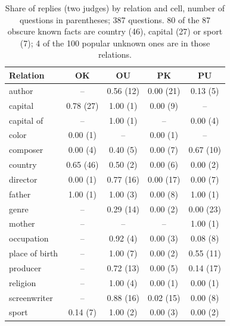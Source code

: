 \begin{table}[h]
\centering\footnotesize\setlength{\tabcolsep}{3pt}
\begin{tabular}{lcccc}
\toprule
Relation & OK & OU & PK & PU \\
\midrule
author & -- & 0.56 (12) & 0.00 (21) & 0.13 (5) \\
capital & 0.78 (27) & 1.00 (1) & 0.00 (9) & -- \\
capital of & -- & 1.00 (1) & -- & 0.00 (4) \\
color & 0.00 (1) & -- & 0.00 (1) & -- \\
composer & 0.00 (4) & 0.40 (5) & 0.00 (7) & 0.67 (10) \\
country & 0.65 (46) & 0.50 (2) & 0.00 (6) & 0.00 (2) \\
director & 0.00 (1) & 0.77 (16) & 0.00 (17) & 0.00 (7) \\
father & 1.00 (1) & 1.00 (3) & 0.00 (8) & 1.00 (1) \\
genre & -- & 0.29 (14) & 0.00 (2) & 0.00 (23) \\
mother & -- & -- & -- & 1.00 (1) \\
occupation & -- & 0.92 (4) & 0.00 (3) & 0.08 (8) \\
place of birth & -- & 1.00 (7) & 0.00 (2) & 0.55 (11) \\
producer & -- & 0.72 (13) & 0.00 (5) & 0.14 (17) \\
religion & -- & 1.00 (4) & 0.00 (1) & 0.00 (1) \\
screenwriter & -- & 0.88 (16) & 0.02 (15) & 0.00 (8) \\
sport & 0.14 (7) & 1.00 (2) & 0.00 (3) & 0.00 (2) \\
\bottomrule
\end{tabular}
\caption{Share of \idk{} replies (two judges) by relation and cell, number of questions in parentheses; 387 questions. 80 of the 87 obscure known facts are country (46), capital (27) or sport (7); 4 of the 100 popular unknown ones are in those relations.}
\label{tab:x0relations}
\end{table}

